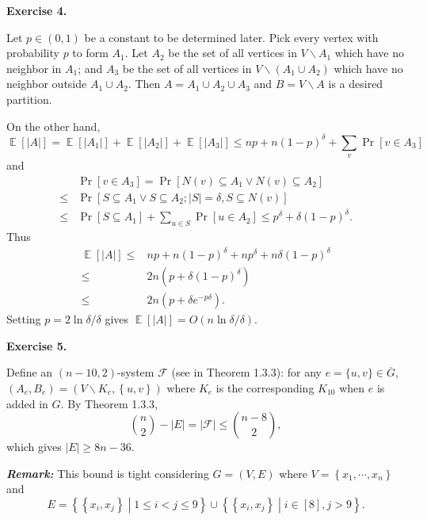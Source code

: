 \documentclass[a4paper]{article}
\newenvironment{exercise}[1]{
	\par
	\noindent\textbf{Exercise #1.}\quad
}{
	\par
	\bigskip
}
\DeclareMathOperator{\E}{\mathbb E}
\newcommand{\pbra}[1]{\left( #1 \right)}
\newcommand{\cbra}[1]{\left\{ #1 \right\}}
\newcommand{\sbra}[1]{\left[ #1 \right]}
\newcommand{\Fcal}{\mathcal{F}}
\begin{document}
\begin{exercise}{4}
    Let $p\in(0,1)$ be a constant to be determined later. Pick every vertex with probability $p$ to form $A_1$. 
    Let $A_2$ be the set of all vertices in $V\backslash A_1$ which have no neighbor in $A_1$; and $A_3$
    be the set of all vertices in $V\backslash\pbra{A_1\cup A_2}$ which have no neighbor outside $A_1\cup A_2$.
    Then $A=A_1\cup A_2\cup A_3$ and $B=V\backslash A$ is a desired partition. 

    On the other hand, 
    $$
    \E\sbra{|A|}=\E\sbra{|A_1|}+\E\sbra{|A_2|}+\E\sbra{|A_3|}\leq np+n(1-p)^\delta+\sum_v\Pr\sbra{v\in A_3}
    $$
    and 
    \begin{align*}
        &\Pr\sbra{v\in A_3}=\Pr\sbra{N(v)\subseteq A_1\lor N(v)\subseteq A_2}\\
        \leq&\Pr\sbra{S\subseteq A_1\lor S\subseteq A_2;|S|=\delta,S\subseteq N(v)}\\
        \leq&\Pr\sbra{S\subseteq A_1}+\sum_{u\in S}\Pr\sbra{u\in A_2}\leq p^\delta+\delta(1-p)^\delta.
    \end{align*}
    Thus 
    \begin{align*}
        \E\sbra{|A|}\leq&np+n(1-p)^\delta+np^\delta+n\delta(1-p)^\delta\\
        \leq&2n\pbra{p+\delta(1-p)^\delta}\\
        \leq&2n\pbra{p+\delta e^{-p\delta}}.
    \end{align*}
    Setting $p=2\ln\delta/\delta$ gives $\E\sbra{|A|}=O(n\ln\delta/\delta)$.
\end{exercise}

\begin{exercise}{5}
    Define an $(n-10,2)$-system $\Fcal$ (see in Theorem 1.3.3): for any $e=\{u,v\}\in\overline G$, 
    $(A_e,B_e)=(V\backslash K_e,\cbra{u,v})$ where $K_e$ is the corresponding $K_{10}$ when $e$ is added in $G$. 
    By Theorem 1.3.3, 
    $$
    \binom n2-|E|=|\Fcal|\leq\binom{n-8}2,
    $$ 
    which gives $|E|\geq8n-36$.
\end{exercise}
\noindent\textbf{\it Remark:} This bound is tight considering $G=(V,E)$ where $V=\cbra{x_1,\cdots,x_n}$ and
    $$
    E=\cbra{\cbra{x_i,x_j}\middle|1\leq i<j\leq 9}\cup\cbra{\cbra{x_i,x_j}\middle|i\in[8],j>9}.
    $$
\end{document}
